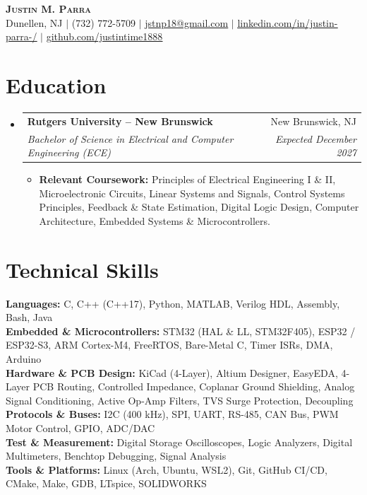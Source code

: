 \documentclass[letterpaper,10pt]{article}
\makeatletter
\newcommand{\resumeItem}[1]{
  \item\small{
    {#1 \vspace{-2pt}}
  }
}
\newcommand{\resumeSubheading}[4]{
  \vspace{-2pt}\item
    \begin{tabular*}{0.97\textwidth}[t]{l@{\extracolsep{\fill}}r}
      \textbf{#1} & #2 \\
      \textit{\small#3} & \textit{\small #4} \\
    \end{tabular*}\vspace{-7pt}
}
\newcommand{\resumeSubHeadingListStart}{\begin{itemize}[leftmargin=0.15in, label={}]}
\newcommand{\resumeSubHeadingListEnd}{\end{itemize}}
\newcommand{\resumeItemListStart}{\begin{itemize}[leftmargin=0.15in]}
\newcommand{\resumeItemListEnd}{\end{itemize}\vspace{-6pt}}
\makeatother
\begin{document}
\begin{center}
  \textbf{\Huge \scshape Justin M. Parra} \\ \vspace{2pt}
  \small Dunellen, NJ $|$ (732) 772-5709 $|$ \href{mailto:jstnp18@gmail.com}{\underline{jstnp18@gmail.com}} $|$ \href{https://linkedin.com/in/justin-parra-/}{\underline{linkedin.com/in/justin-parra-/}} $|$ \href{https://github.com/justintime1888}{\underline{github.com/justintime1888}}
\end{center}

\section{Education}
  \resumeSubHeadingListStart
    \resumeSubheading
      {Rutgers University -- New Brunswick}{New Brunswick, NJ}
      {Bachelor of Science in Electrical and Computer Engineering (ECE)}{Expected December 2027}
      \resumeItemListStart
        \resumeItem{\textbf{Relevant Coursework:} Principles of Electrical Engineering I \& II, Microelectronic Circuits, Linear Systems and Signals, Control Systems Principles, Feedback \& State Estimation, Digital Logic Design, Computer Architecture, Embedded Systems \& Microcontrollers.}
      \resumeItemListEnd
  \resumeSubHeadingListEnd\vspace{-12pt}

\section{Technical Skills}
 \begin{itemize}[leftmargin=0.15in, label={}]
    \small{\item{
     \textbf{Languages:} C, C++ (C++17), Python, MATLAB, Verilog HDL, Assembly, Bash, Java \\
     \textbf{Embedded \& Microcontrollers:} STM32 (HAL \& LL, STM32F405), ESP32 / ESP32-S3, ARM Cortex-M4, FreeRTOS, Bare-Metal C, Timer ISRs, DMA, Arduino \\
     \textbf{Hardware \& PCB Design:} KiCad (4-Layer), Altium Designer, EasyEDA, 4-Layer PCB Routing, Controlled Impedance, Coplanar Ground Shielding, Analog Signal Conditioning, Active Op-Amp Filters, TVS Surge Protection, Decoupling \\
     \textbf{Protocols \& Buses:} I2C (400 kHz), SPI, UART, RS-485, CAN Bus, PWM Motor Control, GPIO, ADC/DAC \\
     \textbf{Test \& Measurement:} Digital Storage Oscilloscopes, Logic Analyzers, Digital Multimeters, Benchtop Debugging, Signal Analysis \\
     \textbf{Tools \& Platforms:} Linux (Arch, Ubuntu, WSL2), Git, GitHub CI/CD, CMake, Make, GDB, LTspice, SOLIDWORKS \\
    }}
 \end{itemize}\vspace{-14pt}
\end{document}
